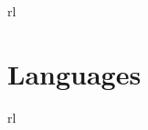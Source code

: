 \documentclass[11pt]{article} %
\begin{document}
\begin{paracol}{2}
\begin{supertabular}{rl}
\end{supertabular}    


\medskip %


\section{Languages}

\begin{supertabular}{rl}


\end{supertabular}    

\vspace{-\baselineskip}\medskip %









	
	

\end{paracol}
\end{document}

